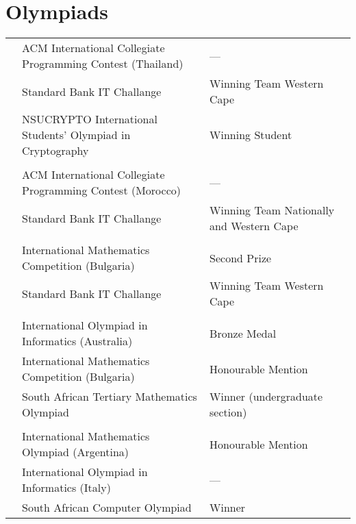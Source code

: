 \section{Olympiads}
\begin{tabular}{R{1cm}|ll}
 & ACM International Collegiate Programming Contest (Thailand) & ---\\
         & Standard Bank IT Challange                                  & Winning Team Western Cape\\
         & NSUCRYPTO International Students' Olympiad in Cryptography  & Winning Student\\
         &                                                             & \\
 & ACM International Collegiate Programming Contest (Morocco)  & ---\\
         & Standard Bank IT Challange                                  & Winning Team Nationally and Western Cape\\
         &                                                             & \\
 & International Mathematics Competition (Bulgaria)            & Second Prize\\
         & Standard Bank IT Challange                                  & Winning Team Western Cape\\
         &                                                             & \\
 & International Olympiad in Informatics (Australia)           & Bronze Medal\\
         & International Mathematics Competition (Bulgaria)            & Honourable Mention\\
         & South African Tertiary Mathematics Olympiad                 & Winner (undergraduate section)\\
         &                                                             & \\
 & International Mathematics Olympiad (Argentina)              & Honourable Mention\\
         & International Olympiad in Informatics (Italy)               & ---\\
         & South African Computer Olympiad                             & Winner\\

\end{tabular}
